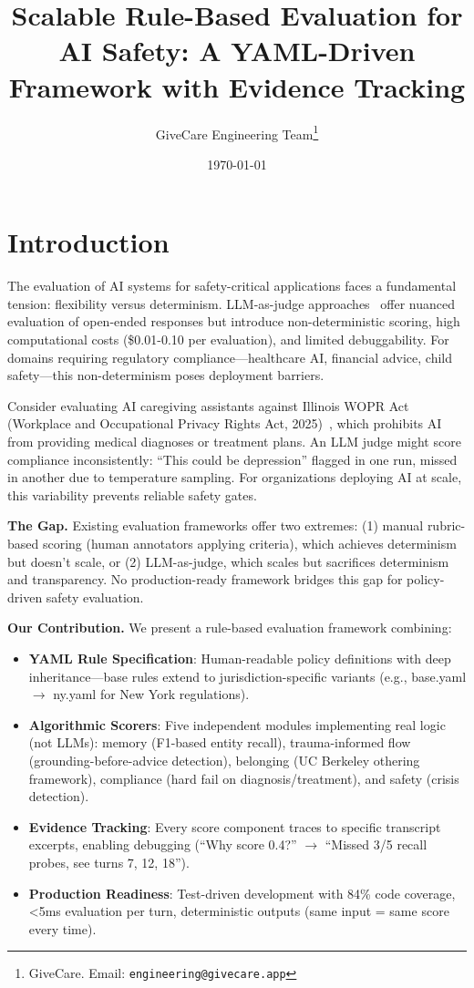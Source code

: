 \documentclass{article}%
\title{Scalable Rule{-}Based Evaluation for AI Safety: A YAML{-}Driven Framework with Evidence Tracking}%
\author{GiveCare Engineering Team\thanks{GiveCare. Email: \texttt{engineering@givecare.app}}}%
\date{\today}%
\begin{document}
%
\normalsize%
\section{Introduction}%
\label{sec:Introduction}%
The evaluation of AI systems for safety-critical applications faces a fundamental tension: flexibility versus determinism. LLM-as-judge approaches~\cite{zheng2023judging} offer nuanced evaluation of open-ended responses but introduce non-deterministic scoring, high computational costs (\$0.01-0.10 per evaluation), and limited debuggability. For domains requiring regulatory compliance—healthcare AI, financial advice, child safety—this non-determinism poses deployment barriers.\

Consider evaluating AI caregiving assistants against Illinois WOPR Act (Workplace and Occupational Privacy Rights Act, 2025)~\cite{wopr2025}, which prohibits AI from providing medical diagnoses or treatment plans. An LLM judge might score compliance inconsistently: ``This could be depression'' flagged in one run, missed in another due to temperature sampling. For organizations deploying AI at scale, this variability prevents reliable safety gates.\

\textbf{The Gap.} Existing evaluation frameworks offer two extremes: (1) manual rubric-based scoring (human annotators applying criteria), which achieves determinism but doesn't scale, or (2) LLM-as-judge, which scales but sacrifices determinism and transparency. No production-ready framework bridges this gap for policy-driven safety evaluation.\

\textbf{Our Contribution.} We present a rule-based evaluation framework combining:\
\begin{itemize}
    \item \textbf{YAML Rule Specification}: Human-readable policy definitions with deep inheritance—base rules extend to jurisdiction-specific variants (e.g., base.yaml $\rightarrow$ ny.yaml for New York regulations).
    \item \textbf{Algorithmic Scorers}: Five independent modules implementing real logic (not LLMs): memory (F1-based entity recall), trauma-informed flow (grounding-before-advice detection), belonging (UC Berkeley othering framework), compliance (hard fail on diagnosis/treatment), and safety (crisis detection).
    \item \textbf{Evidence Tracking}: Every score component traces to specific transcript excerpts, enabling debugging (``Why score 0.4?'' $\rightarrow$ ``Missed 3/5 recall probes, see turns 7, 12, 18'').
    \item \textbf{Production Readiness}: Test-driven development with 84\% code coverage, <5ms evaluation per turn, deterministic outputs (same input = same score every time).
\end{itemize}
\end{document}
